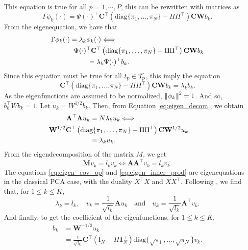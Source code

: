 This equation is true for all $p = 1, \cdots, P$, this can be rewritten with matrices as
\begin{equation}
    \Gamma \phi_k(\cdot) = \Psi(\cdot)^{\top} \mathbf{C}^{\top} \left(\text{diag}\{\pi_1, \dots, \pi_N\} - \Pi\Pi^\top\right) \mathbf{C} \mathbf{W} b_{k}.
\end{equation}
From the eigenequation, we have that
\begin{align*}
    \Gamma \phi_k(\cdot) = \lambda_k \phi_k(\cdot) &\Longleftrightarrow \\
    &\mkern-72mu \Psi(\cdot)^{\top} \mathbf{C}^{\top} \left(\text{diag}\{\pi_1, \dots, \pi_N\} - \Pi\Pi^\top\right) \mathbf{C} \mathbf{W} b_{k} \\
    &\mkern-36mu = \lambda_k \Psi(\cdot)^\top b_k.
\end{align*}
Since this equation must be true for all $t_p \in \mathcal{T}_{p}$, this imply the equation
\begin{equation}\label{eq:eigen_decom}
    \mathbf{C}^{\top} \left(\text{diag}\{\pi_1, \dots, \pi_N\} - \Pi\Pi^\top\right) \mathbf{C} \mathbf{W} b_{k} = \lambda_k b_k.
\end{equation}
As the eigenfunctions are assumed to be normalized, $\left|\!\left|\!\left|\phi_k\right|\!\right|\!\right|^2 = 1$. And so, $b_k^\top W b_k = 1$. Let $u_k = W^{1/2}b_k$. Then, from Equation \eqref{eq:eigen_decom}, we obtain
\begin{align}\label{eq:eigen_cov_op}
    \mathbf{A}^\top\mathbf{A} u_k &= N\lambda_k u_k \Longleftrightarrow \\
    &\mkern-108mu \mathbf{W}^{1/2} \mathbf{C}^{\top} \left(\text{diag}\{\pi_1, \dots, \pi_N\} - \Pi\Pi^\top\right) \mathbf{C} \mathbf{W}^{1/2} u_k \\ 
    &= \lambda_k u_k.
\end{align}
From the eigendecomposition of the matrix $M$, we get
\begin{equation}\label{eq:eigen_inner_prod}
    \mathbf{M}v_k = l_k v_k \Longleftrightarrow \mathbf{A}\mathbf{A}^\top v_k = l_k v_k.
\end{equation}
The equations \eqref{eq:eigen_cov_op} and \eqref{eq:eigen_inner_prod} are eigenequations in the classical PCA case, with the duality $X^\top X$ and $XX^\top$. Following \cite{pagesMultipleFactorAnalysis2014,hardleAppliedMultivariateStatistical2019}, we find that, for $1 \leq k \leq K$,
\begin{equation}
    \lambda_k = l_k, \quad v_k = \frac{1}{\sqrt{l_k}}\mathbf{A} u_k \quad\text{and}\quad u_k = \frac{1}{\sqrt{l_k}} \mathbf{A}^\top v_k.
\end{equation}
And finally, to get the coefficient of the eigenfunctions, for $1 \leq k \leq K$,
\begin{align}
    b_k &= \mathbf{W}^{-1/2}u_k \\
    &= \frac{1}{\sqrt{l_k}} \mathbf{C}^\top \left(\mathrm{I}_{\!N} - \Pi\mathbf{1}_{\!N}^\top\right) \text{diag}\{\sqrt{\pi_1}, \dots, \sqrt{\pi_N}\}v_k.
\end{align}

